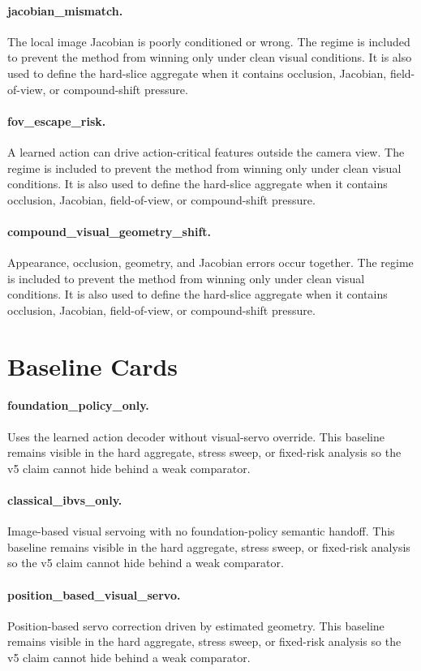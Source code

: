 \documentclass{article}
\begin{document}
\paragraph{jacobian\_mismatch.} The local image Jacobian is poorly conditioned or wrong.
The regime is included to prevent the method from winning only under clean visual conditions. It is also used to define the hard-slice aggregate when it contains occlusion, Jacobian, field-of-view, or compound-shift pressure.
\paragraph{fov\_escape\_risk.} A learned action can drive action-critical features outside the camera view.
The regime is included to prevent the method from winning only under clean visual conditions. It is also used to define the hard-slice aggregate when it contains occlusion, Jacobian, field-of-view, or compound-shift pressure.
\paragraph{compound\_visual\_geometry\_shift.} Appearance, occlusion, geometry, and Jacobian errors occur together.
The regime is included to prevent the method from winning only under clean visual conditions. It is also used to define the hard-slice aggregate when it contains occlusion, Jacobian, field-of-view, or compound-shift pressure.
\clearpage
\section{Baseline Cards}
\paragraph{foundation\_policy\_only.} Uses the learned action decoder without visual-servo override.
This baseline remains visible in the hard aggregate, stress sweep, or fixed-risk analysis so the v5 claim cannot hide behind a weak comparator.
\paragraph{classical\_ibvs\_only.} Image-based visual servoing with no foundation-policy semantic handoff.
This baseline remains visible in the hard aggregate, stress sweep, or fixed-risk analysis so the v5 claim cannot hide behind a weak comparator.
\paragraph{position\_based\_visual\_servo.} Position-based servo correction driven by estimated geometry.
This baseline remains visible in the hard aggregate, stress sweep, or fixed-risk analysis so the v5 claim cannot hide behind a weak comparator.
\end{document}
